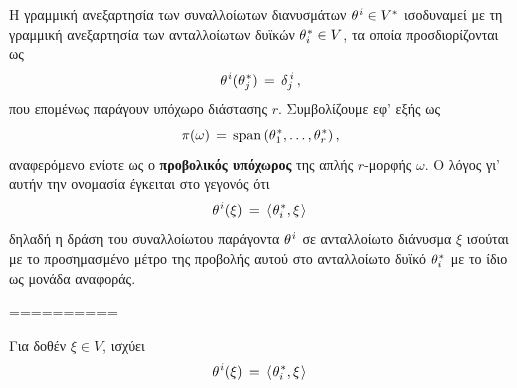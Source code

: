\documentclass[11pt,a4paper,twoside,openright]{book}
\begin{document}
Η γραμμική ανεξαρτησία των συναλλοίωτων διανυσμάτων
$\theta^{\hspace{.5pt}i} \in V^*$
ισοδυναμεί με τη γραμμική ανεξαρτησία των ανταλλοίωτων δυϊκών
$\theta^{\hspace{.5pt}*}_i \in V$,
τα οποία προσδιορίζονται ως
\begin{equation}
\theta^{\hspace{.5pt}i}(\theta^{\hspace{.5pt}*}_j)\,=\,\delta^{\,i}_j\,,
\end{equation}
που επομένως παράγουν υπόχωρο διάστασης $r$.
Συμβολίζουμε εφ' εξής ως
\begin{equation}
\pi(\omega)
\,=\,
\operatorname{span}\,(\theta^{\hspace{.5pt}*}_1, \dots, \theta^{\hspace{.5pt}*}_r)\,,
\end{equation}
αναφερόμενο ενίοτε ως ο \textbf{προβολικός υπόχωρος} της απλής $r$-μορφής $\omega$. Ο λόγος γι' αυτήν την ονομασία έγκειται στο γεγονός ότι
\begin{equation}
\theta^{\hspace{.5pt}i}(\xi)
\,=\,
\left \langle \hspace{.75pt}\theta^{\hspace{.5pt}*}_i,\xi\hspace{.75pt} \right \rangle\,
\end{equation}
δηλαδή η δράση του συναλλοίωτου παράγοντα
$\theta^{\hspace{.5pt}i}$ σε ανταλλοίωτο διάνυσμα $\xi$
ισούται με το προσημασμένο
μέτρο της προβολής αυτού στο ανταλλοίωτο δυϊκό
$\theta^{\hspace{.5pt}*}_i$ με το ίδιο ως μονάδα αναφοράς.

==========

Για δοθέν $\xi \in V$, ισχύει
\begin{equation}
\theta^{\hspace{.5pt}i}(\xi)
\,=\,
\left \langle \hspace{.75pt}\theta^{\hspace{.5pt}*}_i,\xi\hspace{.75pt} \right \rangle\,
\end{equation}
\end{document}
